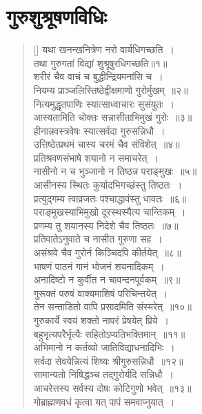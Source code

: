 \documentclass[twoside,12pt,notitlepage]{book}
\begin{document}
\section{गुरुशुश्रूषणविधिः}
\begin{verse}[\versewidth]
यथा खनन्खनित्रेण नरो वार्यधिगच्छति~।\\[-6pt]
तथा गुरुगतां विद्यां शुश्रूषुरधिगच्छति॥१॥\\
शरीरं चैव वाचं च बुद्धीन्द्रियमनांसि च~।\\[-6pt]
नियम्य प्राञ्जलिस्तिष्ठेद्वीक्षमाणो गुरोर्मुखम्~॥२॥\\
नित्यमुद्धृतपाणिः स्यात्साध्वाचारः सुसंयुतः~।\\[-6pt]
आस्यतामिति चोक्तः सन्नासीताभिमुखं गुरोः~॥३॥\\
हीनान्नवस्त्रवेषः स्यात्सर्वदा गुरुसन्निधौ~।\\[-6pt]
उत्तिष्ठेत्प्रथमं चास्य चरमं चैव संविशेत्~॥४॥\\
प्रतिश्रवणसंभाषे शयानो न समाचरेत्~।\\[-6pt]
नासीनो न च भुञ्जानो न तिष्ठन्न पराङ्मुखः~॥५॥\footA \\
आसीनस्य स्थितः कुर्यादभिगच्छंस्तु तिष्ठतः~।\\[-6pt]
प्रत्युद्गम्य त्वाव्रजतः पश्चाद्धावंस्तु धावतः~॥६॥\\
पराङ्मुखस्याभिमुखो दूरस्थस्यैत्य चान्तिकम्~।\\[-6pt]
प्रणम्य तु शयानस्य निदेशे चैव तिष्ठतः~॥७॥\footA \\
प्रतिवातेऽनुवाते च नासीत गुरुणा सह~।\\[-6pt]
असंश्रवे चैव गुरोर्न किञ्चिदपि कीर्तयेत्~॥८॥\footA \\
भाषणं पाठनं गानं भोजनं शयनादिकम्~।\\[-6pt]
अनादिष्टो न कुर्वीत न चावन्दनपूर्वकम्~॥९॥\\
गुरूक्तं परुषं वाक्यमाशिषं परिचिन्तयेत्~।\\[-6pt]
तेन सन्ताडितो वापि प्रसादमिति संस्मरेत्~॥१०॥\\
गुरुकार्ये स्वयं शक्तो नापरं प्रेषयेत् प्रिये~।\\[-6pt]
बहुभृत्यपरैर्भृत्यैः सहितोऽप्यतिभक्तिमान्~॥११॥\\
अभिमानो न कर्तव्यो जातिविद्याधनादिभिः~।\\[-6pt]
सर्वदा सेवयेन्नित्यं शिष्यः श्रीगुरुसन्निधौ~॥१२॥\\
सामान्यतो निषिद्धञ्च तद्गुरोर्यदि सन्निधौ~।\\[-6pt]
आचरेत्तस्य सर्वस्य दोषः कोटिगुणो भवेत्~॥१३॥\\
गोब्राह्मणवधं कृत्वा यत् पापं समवाप्नुयात्~।\\[-6pt]

\end{verse}
\end{document}
